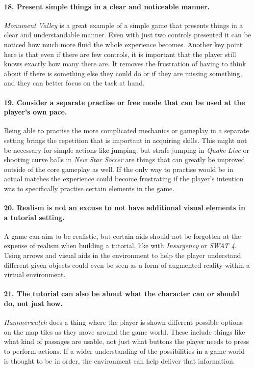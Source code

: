 \paragraph{18. Present simple things in a clear and noticeable manner.}
\textit{Monument Valley} is a great example of a simple game that presents things in a clear and understandable manner. Even with just two controls presented it can be noticed how much more fluid the whole experience becomes. Another key point here is that even if there are few controls, it is important that the player still knows exactly how many there are. It removes the frustration of having to think about if there is something else they could do or if they are missing something, and they can better focus on the task at hand.
\paragraph{19. Consider a separate practise or free mode that can be used at the player's own pace.}
Being able to practise the more complicated mechanics or gameplay in a separate setting brings the repetition that is important in acquiring skills. This might not be necessary for simple actions like jumping, but strafe jumping in \textit{Quake Live} or shooting curve balls in \textit{New Star Soccer} are things that can greatly be improved outside of the core gameplay as well. If the only way to practise would be in actual matches the experience could become frustrating if the player's intention was to specifically practise certain elements in the game.
\paragraph{20. Realism is not an excuse to not have additional visual elements in a tutorial setting.} A game can aim to be realistic, but certain aids should not be forgotten at the expense of realism when building a tutorial, like with \textit{Insurgency} or \textit{SWAT 4}. Using arrows and visual aids in the environment to help the player understand different given objects could even be seen as a form of augmented reality within a virtual environment.
\paragraph{21. The tutorial can also be about what the character can or should do, not just how.}
\textit{Hammerwatch} does a thing where the player is shown different possible options on the map tiles as they move around the game world. These include things like what kind of passages are usable, not just what buttons the player needs to press to perform actions. If a wider understanding of the possibilities in a game world is thought to be in order, the environment can help deliver that information.
